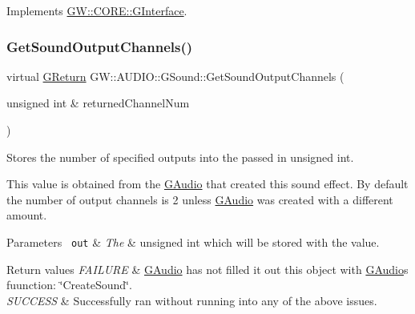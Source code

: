 Implements \mbox{\hyperlink{classGW_1_1CORE_1_1GInterface_aacf5834174a7024f8a3c361122ee9e76}{G\+W\+::\+C\+O\+R\+E\+::\+G\+Interface}}.

\mbox{\label{classGW_1_1AUDIO_1_1GSound_a9dcb3529b8819eedfd40e865a3bc611f}} 
\subsubsection{\texorpdfstring{GetSoundOutputChannels()}{GetSoundOutputChannels()}}
{\footnotesize\ttfamily virtual \mbox{\hyperlink{namespaceGW_a67a839e3df7ea8a5c5686613a7a3de21}{G\+Return}} G\+W\+::\+A\+U\+D\+I\+O\+::\+G\+Sound\+::\+Get\+Sound\+Output\+Channels (\begin{DoxyParamCaption}\item[{unsigned int \&}]{returned\+Channel\+Num }\end{DoxyParamCaption})\hspace{0.3cm}{\ttfamily [pure virtual]}}



Stores the number of specified outputs into the passed in unsigned int. 

This value is obtained from the \mbox{\hyperlink{classGW_1_1AUDIO_1_1GAudio}{G\+Audio}} that created this sound effect. By default the number of output channels is 2 unless \mbox{\hyperlink{classGW_1_1AUDIO_1_1GAudio}{G\+Audio}} was created with a different amount.


\begin{DoxyParams}[1]{Parameters}
\mbox{\texttt{ out}}  & {\em The} & unsigned int which will be stored with the value.\\
\hline
\end{DoxyParams}

\begin{DoxyRetVals}{Return values}
{\em F\+A\+I\+L\+U\+RE} & \mbox{\hyperlink{classGW_1_1AUDIO_1_1GAudio}{G\+Audio}} has not filled it out this object with \mbox{\hyperlink{classGW_1_1AUDIO_1_1GAudio}{G\+Audio}}\textquotesingle{}s fuunction\+: \char`\"{}\+Create\+Sound\char`\"{}. \\
\hline
{\em S\+U\+C\+C\+E\+SS} & Successfully ran without running into any of the above issues. \\
\hline
\end{DoxyRetVals}
\mbox{\label{classGW_1_1AUDIO_1_1GSound_acca8a7684851e32f4022006fd9eacf6c}} 
